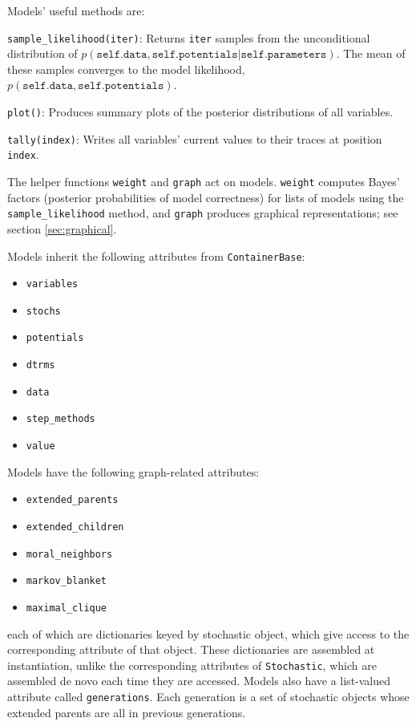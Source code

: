 Models' useful methods are:
\begin{description}
    \item \texttt{sample\_likelihood(iter)}: Returns \texttt{iter} samples from the unconditional distribution of $p(\mathtt{self.data, self.potentials}|\mathtt{self.parameters})$. The mean of these samples converges to the model likelihood, $p(\mathtt{self.data, self.potentials})$.
    \item \texttt{plot()}: Produces summary plots of the posterior distributions of all variables.
    \item \texttt{tally(index)}: Writes all variables' current values to their traces at position \texttt{index}.
\end{description}

The helper functions \texttt{weight} and \texttt{graph} act on models. \texttt{weight} computes Bayes' factors (posterior probabilities of model correctness) for lists of models using the \texttt{sample\_likelihood} method, and \texttt{graph} produces graphical representations; see section \ref{sec:graphical}.

Models inherit the following attributes from \texttt{ContainerBase}:
\begin{itemize}
    \item \texttt{variables}
    \item \texttt{stochs}
    \item \texttt{potentials}
    \item \texttt{dtrms}
    \item \texttt{data}
    \item \texttt{step_methods}
    \item \texttt{value}
\end{itemize}

Models have the following graph-related attributes:
\begin{itemize}
    \item \texttt{extended\_parents}
    \item \texttt{extended\_children}
    \item \texttt{moral\_neighbors}
    \item \texttt{markov\_blanket}
    \item \texttt{maximal\_clique}
\end{itemize}
each of which are dictionaries keyed by stochastic object, which give access to the corresponding attribute of that object. These dictionaries are assembled at instantiation, unlike the corresponding attributes of \texttt{Stochastic}, which are assembled de novo each time they are accessed. Models also have a list-valued attribute called \texttt{generations}. Each generation is a set of stochastic objects whose extended parents are all in previous generations.

